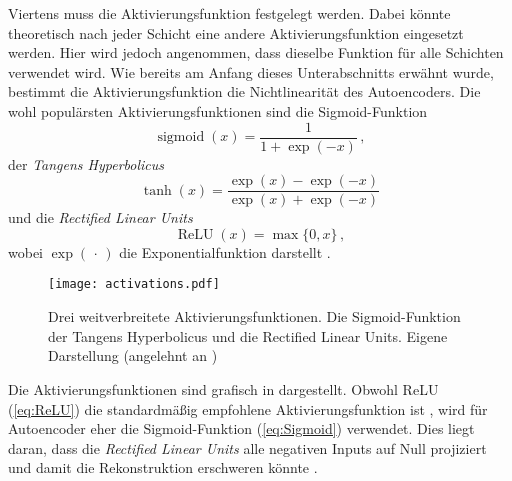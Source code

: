 Viertens muss die Aktivierungsfunktion festgelegt werden. Dabei könnte theoretisch nach jeder
Schicht eine andere Aktivierungsfunktion eingesetzt werden. Hier wird jedoch angenommen, dass
dieselbe Funktion für alle Schichten verwendet wird. Wie bereits am Anfang dieses Unterabschnitts
erwähnt wurde, bestimmt die Aktivierungsfunktion die Nichtlinearität des Autoencoders. Die wohl
populärsten Aktivierungsfunktionen sind die Sigmoid-Funktion
\begin{equation}
	\label{eq:Sigmoid}
	\operatorname{sigmoid}(x) = \frac{1}{1 + \exp (-x)} \, ,
\end{equation}
der \textit{Tangens Hyperbolicus}
\begin{equation}
	\label{eq:tanh}
	\operatorname{tanh}(x) = \frac{\exp(x) - \exp(-x)}{\exp(x) + \exp(-x)}
\end{equation}
und die \textit{Rectified Linear Units}
\begin{equation}
	\label{eq:ReLU}
	\operatorname{ReLU}(x) = \max\{0, x\} \, ,
\end{equation}
wobei $\exp(\, \cdot \,)$ die Exponentialfunktion darstellt \parencites[191 -- 195]{Goodfellow.2016}[4]{Charte.2018}.
\begin{figure}
	\centering
	\texttt{[image: activations.pdf]}
	\caption[Drei weitverbreitete Aktivierungsfunktionen.]{Drei weitverbreitete Aktivierungsfunktionen. \captiona Die Sigmoid-Funktion \captionb der Tangens Hyperbolicus und \captionc die Rectified Linear Units. Eigene Darstellung (angelehnt an \textcite[4]{Charte.2018})}
	\label{fig:activations}
\end{figure}
Die Aktivierungsfunktionen sind grafisch in  dargestellt.
Obwohl ReLU (\eqref{eq:ReLU}) die standardmäßig empfohlene Aktivierungsfunktion ist \parencite[195]{Goodfellow.2016}, wird für Autoencoder eher die Sigmoid-Funktion (\eqref{eq:Sigmoid})
verwendet. Dies liegt daran, dass die \textit{Rectified Linear Units} alle negativen Inputs auf
Null projiziert und damit die Rekonstruktion erschweren könnte \parencite[4]{Charte.2018}.


